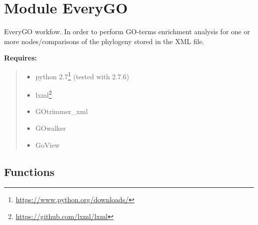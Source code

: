 %
%
%


\section{Module EveryGO}

    \label{EveryGO}
EveryGO workfow. In order to perform GO-terms enrichment analysis for one 
or more nodes/comparisons of the phylogeny stored in the XML file.

\textbf{Requires:}
\begin{quote}
  \begin{itemize}

  \item
    \setlength{\parskip}{0.6ex}
python 
2.7\footnote{\href{https://www.python.org/downloads/}{https://www.python.org/downloads/}}
(tested with 2.7.6)



  \item lxml\footnote{\href{https://github.com/lxml/lxml}{https://github.com/lxml/lxml}}



  \item GOtrimmer\_xml



  \item GOwalker



  \item GoView



\end{itemize}

\end{quote}



  \subsection{Functions}

